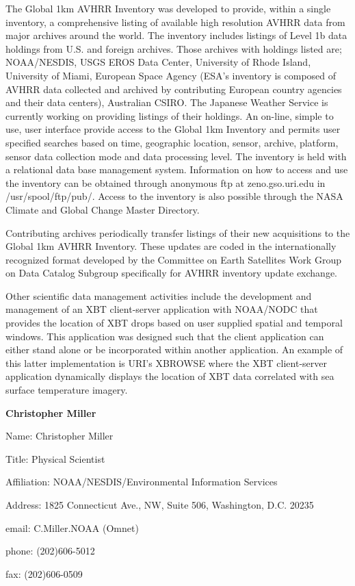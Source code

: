 	The Global 1km AVHRR Inventory was developed to provide, within a 
single inventory, a comprehensive listing of available high resolution 
AVHRR data from major archives around the world.  The inventory includes 
listings of Level 1b data holdings from U.S. and foreign archives.  Those 
archives with holdings listed are; NOAA/NESDIS, USGS EROS Data Center, 
University of Rhode Island, University of Miami,  European Space Agency 
(ESA's inventory is composed of AVHRR data collected and archived by 
contributing European country agencies and their data centers),      
Australian CSIRO.  The Japanese Weather Service is currently working on 
providing listings of their holdings.  An on-line, simple to use, user 
interface provide access to the Global 1km Inventory and permits user 
specified searches based on time, geographic location, sensor, archive, 
platform, sensor data collection mode and data processing level.  The      
inventory is held with a relational data base management system.  
Information on how to access and use the inventory can be obtained 
through anonymous ftp at zeno.gso.uri.edu in /usr/spool/ftp/pub/.       
Access to the inventory is also possible through the NASA Climate and 
Global Change Master Directory.

	Contributing archives periodically transfer listings of their new 
acquisitions to the Global 1km AVHRR Inventory.  These updates are coded 
in the internationally recognized format developed by the Committee on 
Earth Satellites Work Group on Data Catalog Subgroup specifically for 
AVHRR inventory update exchange.  

	Other scientific data management activities include the 
development and management of an XBT client-server application with 
NOAA/NODC that provides the location of XBT drops based on user supplied 
spatial and temporal windows.  This application was designed such that 
the client application can either stand alone or be incorporated within 
another application.  An example of this latter implementation is URI's 
XBROWSE where the XBT client-server application dynamically displays 
the location of XBT data correlated with sea surface temperature imagery.  
\newpage

\begin{center}
\LARGE
{\bf  Christopher Miller}
\end{center}
\large
{}
\normalsize
\smallskip
\begin{description}
\item{Name:}  Christopher Miller
\item{Title:}  Physical Scientist
\item{Affiliation:}  NOAA/NESDIS/Environmental Information Services
\item{Address:}  1825 Connecticut Ave., NW, Suite 506, Washington, D.C.  
20235
\item{email:}  C.Miller.NOAA (Omnet)
\item{phone:}  (202)606-5012
\item{fax:}  (202)606-0509
\end{description}

